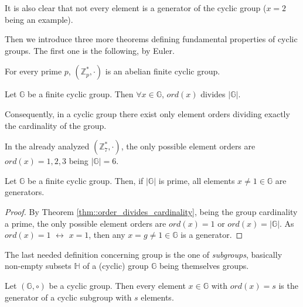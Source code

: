 \begin{myrem}
    It is also clear that not every element is a generator of the cyclic group ($x=2$ being an example).
\end{myrem}
\noindent
Then we introduce three more theorems defining fundamental properties of cyclic groups. The first one is the following, by Euler.
\begin{mytheorem}
    For every prime $p$, $(\mathbb{Z}_p^{*},\cdot)$ is an abelian finite cyclic group.
\end{mytheorem}
\begin{mytheorem}
\label{thm::order_divides_cardinality}
    Let $\mathbb{G}$ be a finite cyclic group. Then $\forall x \in \mathbb{G}$, $ord(x)$ divides $|\mathbb{G}|$.
\end{mytheorem}
\noindent
Consequently, in a cyclic group there exist only element orders dividing exactly the cardinality of the group. 
\begin{myrem}
    In the already analyzed $(\mathbb{Z}_7^{*},\cdot)$, the only possible element orders are $ord(x)=1,2,3$ being $|\mathbb{G}| = 6$.
\end{myrem}
\begin{mytheorem}
\label{thm::prime_order_all_gen}
    Let $\mathbb{G}$ be a finite cyclic group. Then, if $|\mathbb{G}|$ is prime, all elements $x \neq 1 \in \mathbb{G}$ are generators.
\end{mytheorem}
\begin{proof}
    By Theorem \ref{thm::order_divides_cardinality}, being the group cardinality a prime, the only possible element orders are $ord(x)=1$ or $ord(x)=|\mathbb{G}|$. As $ord(x)=1$ $\longleftrightarrow$ $x=1$, then any $x=g \neq 1 \in \mathbb{G}$ is a generator.
\end{proof}
\noindent
The last needed definition concerning group is the one of \textit{subgroups}, basically non-empty subsets $\mathbb{H}$ of a (cyclic) group $\mathbb{G}$ being themselves groups.
\begin{mytheorem}
    Let $(\mathbb{G},\circ)$ be a cyclic group. Then every element $x \in \mathbb{G}$ with $ord(x)=s$ is the generator of a cyclic subgroup with $s$ elements.
\end{mytheorem}
